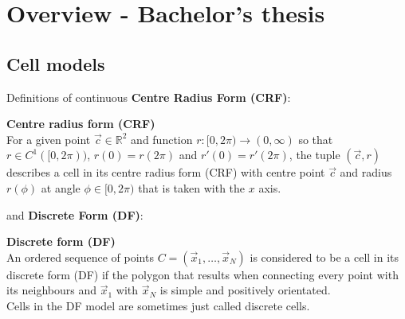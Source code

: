 \section*{Overview - Bachelor's thesis }

\subsection*{Cell models}

Definitions of continuous \textbf{Centre Radius Form (CRF)}:

\begin{definition} \textbf{Centre radius form (CRF)} \label{def:CRF}  \\
	For a given point $\vec{c} \in \mathbb{R}^2$ and function $r: [0, 2\pi) \rightarrow (0, \infty)$ so that $r \in C^1([0, 2\pi))$, $r(0) = r(2\pi)$ and $r'(0) = r'(2\pi)$, the tuple $(\vec{c}, r)$ describes a cell in its centre radius form (CRF) with centre point $\vec{c}$ and radius $r(\phi)$ at angle $\phi \in [0, 2\pi)$ that is taken with the $x$ axis. \\
\end{definition}

and \textbf{Discrete Form (DF)}:

\begin{definition} \textbf{Discrete form (DF)} \label{def:DF}  \\
	An ordered sequence of points $C = (\vec{x}_1, \ldots , \vec{x}_N)$ is considered to be a cell in its discrete form (DF) if the polygon that results when connecting every point with its neighbours and $\vec{x}_1$ with $\vec{x}_N$ is simple and positively orientated. \\	
	Cells in the DF model are sometimes just called discrete cells. \\
\end{definition}

